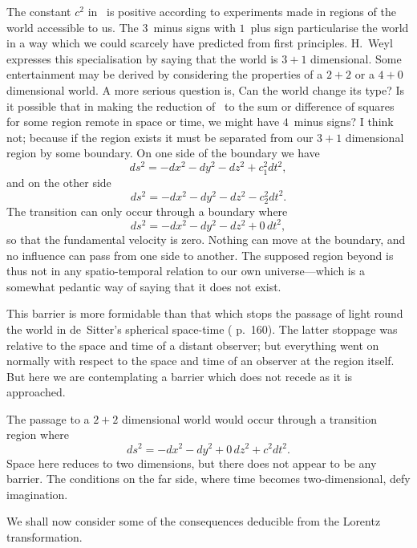 \documentclass[12pt]{book}
\begin{document}
The constant $c^2$ in~ is positive according to experiments made in
regions of the world accessible to us. The $3$~minus signs with $1$~plus sign
particularise the world in a way which we could scarcely have predicted from
first principles. H.~Weyl expresses this specialisation by saying that the world
is $3 + 1$ dimensional. Some entertainment may be derived by considering the
properties of a $2 + 2$ or a $4 + 0$ dimensional world. A more serious question
is, Can the world change its type? Is it possible that in making the reduction
of~ to the sum or difference of squares for some region remote in space or
time, we might have $4$~minus signs? I think not; because if the region exists
it must be separated from our $3 + 1$ dimensional region by some boundary.
On one side of the boundary we have
\[
ds^2 = -dx^2 - dy^2 - dz^2 + c_1^2 dt^2,
\]
and on the other side
\[
ds^2 = -dx^2 - dy^2 - dz^2 - c_2^2 dt^2.
\]
The transition can only occur through a boundary where
\[
ds^2 = -dx^2 - dy^2 - dz^2 + 0\, dt^2,
\]
so that the fundamental velocity is zero. Nothing can move at the boundary,
and no influence can pass from one side to another. The supposed region
beyond is thus not in any spatio\hyp{}temporal relation to our own universe---which
is a somewhat pedantic way of saying that it does not exist.

This barrier is more formidable than that which stops the passage of light
round the world in de~Sitter's spherical space-time (
p.~160). The latter stoppage was relative to the space and time of a
distant observer; but everything went on normally with respect to the space
and time of an observer at the region itself. But here we are contemplating
a barrier which does not recede as it is approached.

The passage to a $2 + 2$ dimensional world would occur through a transition
region where
\[
ds^2 = -dx^2 - dy^2 + 0\, dz^2 + c^2 dt^2.
\]
Space here reduces to two dimensions, but there does not appear to be any
%
barrier. The conditions on the far side, where time becomes two\hyp{}dimensional,
defy imagination.

%
%

We shall now consider some of the consequences deducible from the
Lorentz transformation.
%
\end{document}

